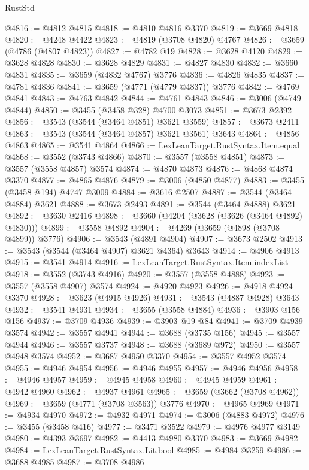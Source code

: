 \begin{lexlean}{RustStd}
\begin{coremodule}
@4816 := @4812 @4815
@4818 := @4810 @4816 @3370
@4819 := @3669 @4818
@4820 := @4248 @4422
@4823 := @4819 (@3708 @4820) @4767
@4826 := @3659 (@4786 (@4807 @4823))
@4827 := @4782 @19
@4828 := @3628 @4120
@4829 := @3628 @4828
@4830 := @3628 @4829
@4831 := @4827 @4830
@4832 := @3660 @4831
@4835 := @3659 (@4832 @4767) @3776
@4836 := @4826 @4835
@4837 := @4781 @4836
@4841 := @3659 (@4771 (@4779 @4837)) @3776
@4842 := @4769 @4841
@4843 := @4763 @4842
@4844 := @4761 @4843
@4846 := @3006 (@4749 @4844)
@4850 := @3455 (@3458 @328) @4700 @3073
@4851 := @3673 @2392
@4856 := @3543 (@3544 (@3464 @4851) @3621 @3559)
@4857 := @3673 @2411
@4863 := @3543 (@3544 (@3464 @4857) @3621 @3561) @3643
@4864 := @4856 @4863
@4865 := @3541 @4864
@4866 := LexLeanTarget.RustSyntax.Item.equal
@4868 := @3552 (@3743 @4866)
@4870 := @3557 (@3558 @4851)
@4873 := @3557 (@3558 @4857) @3574
@4874 := @4870 @4873
@4876 := @4868 @4874 @3370
@4877 := @4865 @4876
@4879 := @3006 (@4850 @4877)
@4883 := @3455 (@3458 @194) @4747 @3009
@4884 := @3616 @2507
@4887 := @3544 (@3464 @4884) @3621
@4888 := @3673 @2493
@4891 := @3544 (@3464 @4888) @3621
@4892 := @3630 @2416
@4898 := @3660 (@4204 (@3628 (@3626 (@3464 @4892) @4830)))
@4899 := @3558 @4892
@4904 := @4269 (@3659 (@4898 (@3708 @4899)) @3776)
@4906 := @3543 (@4891 @4904)
@4907 := @3673 @2502
@4913 := @3543 (@3544 (@3464 @4907) @3621 @4364) @3643
@4914 := @4906 @4913
@4915 := @3541 @4914
@4916 := LexLeanTarget.RustSyntax.Item.indexList
@4918 := @3552 (@3743 @4916)
@4920 := @3557 (@3558 @4888)
@4923 := @3557 (@3558 @4907) @3574
@4924 := @4920 @4923
@4926 := @4918 @4924 @3370
@4928 := @3623 (@4915 @4926)
@4931 := @3543 (@4887 @4928) @3643
@4932 := @3541 @4931
@4934 := @3655 (@3558 @4884)
@4936 := @3903 @156 @156
@4937 := @3709 @4936
@4939 := @3903 @19 @84
@4941 := @3709 @4939 @3574
@4942 := @3557 @4941
@4944 := @3688 (@3735 @156)
@4945 := @3557 @4944
@4946 := @3557 @3737
@4948 := @3688 (@3689 @972)
@4950 := @3557 @4948 @3574
@4952 := @3687 @4950 @3370
@4954 := @3557 @4952 @3574
@4955 := @4946 @4954
@4956 := @4946 @4955
@4957 := @4946 @4956
@4958 := @4946 @4957
@4959 := @4945 @4958
@4960 := @4945 @4959
@4961 := @4942 @4960
@4962 := @4937 @4961
@4965 := @3659 (@3662 (@3708 @4962))
@4969 := @3659 (@4771 (@3708 @3563)) @3776
@4970 := @4965 @4969
@4971 := @4934 @4970
@4972 := @4932 @4971
@4974 := @3006 (@4883 @4972)
@4976 := @3455 (@3458 @416)
@4977 := @3471 @3522
@4979 := @4976 @4977 @3149
@4980 := @4393 @3697
@4982 := @4413 @4980 @3370
@4983 := @3669 @4982
@4984 := LexLeanTarget.RustSyntax.Lit.bool
@4985 := @4984 @3259
@4986 := @3688 @4985
@4987 := @3708 @4986

\end{coremodule}
\end{lexlean}
